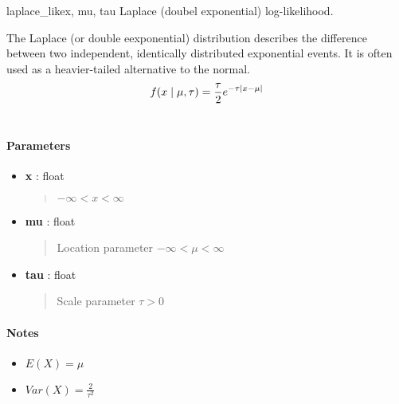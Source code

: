 \hypertarget{pymc.distributions.laplace_like}{}\begin{funcdesc}{laplace\_like}{x, mu, tau}
Laplace (doubel exponential) log-likelihood.

The Laplace (or double eexponential) distribution describes the
difference between two independent, identically distributed exponential
events. It is often used as a heavier-tailed alternative to the normal.
\begin{gather}
\begin{split}f(x \mid \mu, \tau) = \frac{\tau}{2}e^{-\tau|x-\mu|}\end{split}\notag\\\begin{split}\end{split}\notag
\end{gather}\paragraph{Parameters}\begin{itemize}

\item[] \textbf{x} : float
\begin{quote}

$-\infty < x < \infty$
\end{quote}

\item[] \textbf{mu} : float
\begin{quote}

Location parameter $-\infty < \mu < \infty$
\end{quote}

\item[] \textbf{tau} : float
\begin{quote}

Scale parameter $\tau > 0$
\end{quote}
\end{itemize}
\paragraph{Notes}
\begin{itemize}
\item {} 
$E(X) = \mu$

\item {} 
$Var(X) = \frac{2}{\tau^2}$

\end{itemize}
\end{funcdesc}

